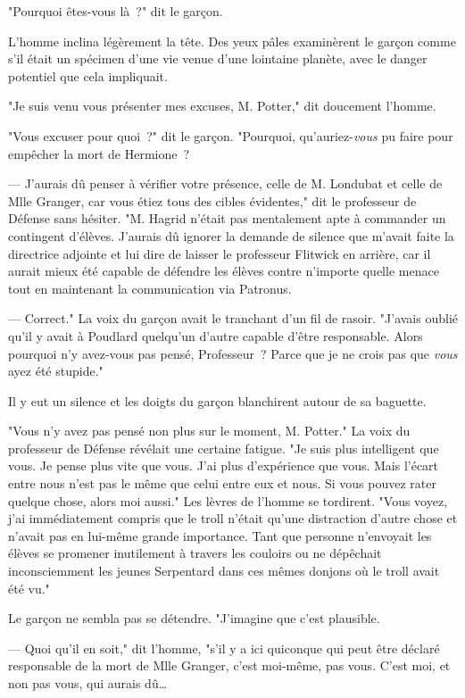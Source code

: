 "Pourquoi êtes-vous là~?" dit le garçon.

L'homme inclina légèrement la tête. Des yeux pâles examinèrent le garçon comme s'il était un spécimen d'une vie venue d'une lointaine planète, avec le danger potentiel que cela impliquait.

"Je suis venu vous présenter mes excuses, M. Potter," dit doucement l'homme.

"Vous excuser pour quoi~?" dit le garçon. "Pourquoi, qu'auriez-\emph{vous} pu faire pour empêcher la mort de Hermione~?

--- J'aurais dû penser à vérifier votre présence, celle de M. Londubat et celle de Mlle Granger, car vous étiez tous des cibles évidentes," dit le professeur de Défense sans hésiter. "M. Hagrid n'était pas mentalement apte à commander un contingent d'élèves. J'aurais dû ignorer la demande de silence que m'avait faite la directrice adjointe et lui dire de laisser le professeur Flitwick en arrière, car il aurait mieux été capable de défendre les élèves contre n'importe quelle menace tout en maintenant la communication via Patronus.

--- Correct." La voix du garçon avait le tranchant d'un fil de rasoir. "J'avais oublié qu'il y avait à Poudlard quelqu'un d'autre capable d'être responsable. Alors pourquoi n'y avez-vous pas pensé, Professeur~? Parce que je ne crois pas que \emph{vous} ayez été stupide."

Il y eut un silence et les doigts du garçon blanchirent autour de sa baguette.

"Vous n'y avez pas pensé non plus sur le moment, M. Potter." La voix du professeur de Défense révélait une certaine fatigue. "Je suis plus intelligent que vous. Je pense plus vite que vous. J'ai plus d'expérience que vous. Mais l'écart entre nous n'est pas le même que celui entre eux et nous. Si vous pouvez rater quelque chose, alors moi aussi." Les lèvres de l'homme se tordirent. "Vous voyez, j'ai immédiatement compris que le troll n'était qu'une distraction d'autre chose et n'avait pas en lui-même grande importance. Tant que personne n'envoyait les élèves se promener inutilement à travers les couloirs ou ne dépêchait inconsciemment les jeunes Serpentard dans ces mêmes donjons où le troll avait été vu."

Le garçon ne sembla pas se détendre. "J'imagine que c'est plausible.

--- Quoi qu'il en soit," dit l'homme, "s'il y a ici quiconque qui peut être déclaré responsable de la mort de Mlle Granger, c'est moi-même, pas vous. C'est moi, et non pas vous, qui aurais dû…

